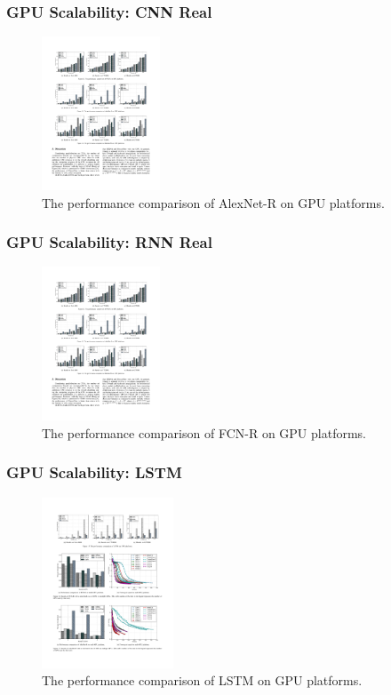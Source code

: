 
\begin{frame}
	\MyLogo
	\frametitle{GPU Scalability: CNN Real}

	\begin{figure}[htbp] 
		\includegraphics[height=1.8in]{figures/AlexNet-R2.pdf} 
		\caption{The performance comparison of AlexNet-R on GPU platforms.}
	\end{figure}

\end{frame}


\begin{frame}
	\MyLogo
	\frametitle{GPU Scalability: RNN Real}
	
	\begin{figure}[htbp] 
		\includegraphics[height=1.8in]{figures/FCN-R2.pdf} 
		\caption{The performance comparison of FCN-R on GPU platforms.}
	\end{figure}

\end{frame}


\begin{frame}
	\MyLogo
	\frametitle{GPU Scalability: LSTM}
	
	\begin{figure}[htbp] 
		\includegraphics[height=2.0in]{figures/LSTM2.pdf} 
		\caption{The performance comparison of LSTM on GPU platforms.}
	\end{figure}
	
\end{frame}